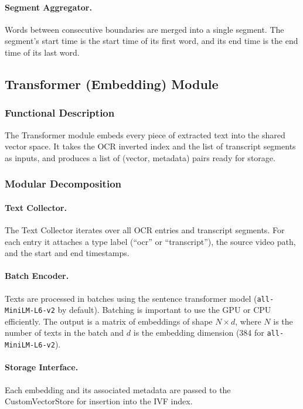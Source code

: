 \documentclass[12pt, a4paper]{report}
\begin{document}
\paragraph{Segment Aggregator.}
Words between consecutive boundaries are merged into a single segment.
The segment's start time is the start time of its first word, and its end
time is the end time of its last word.

\subsection{Transformer (Embedding) Module}

\subsubsection{Functional Description}

The Transformer module embeds every piece of extracted text into the
shared vector space. It takes the OCR inverted index and the list of
transcript segments as inputs, and produces a list of (vector, metadata)
pairs ready for storage.

\subsubsection{Modular Decomposition}

\paragraph{Text Collector.}
The Text Collector iterates over all OCR entries and transcript segments.
For each entry it attaches a type label (``ocr'' or ``transcript''), the
source video path, and the start and end timestamps.

\paragraph{Batch Encoder.}
Texts are processed in batches using the sentence transformer model
(\texttt{all-MiniLM-L6-v2} by default). Batching is important to use
the GPU or CPU efficiently. The output is a matrix of embeddings of
shape $N \times d$, where $N$ is the number of texts in the batch and
$d$ is the embedding dimension (384 for \texttt{all-MiniLM-L6-v2}).

\paragraph{Storage Interface.}
Each embedding and its associated metadata are passed to the CustomVectorStore
for insertion into the IVF index.
\end{document}
